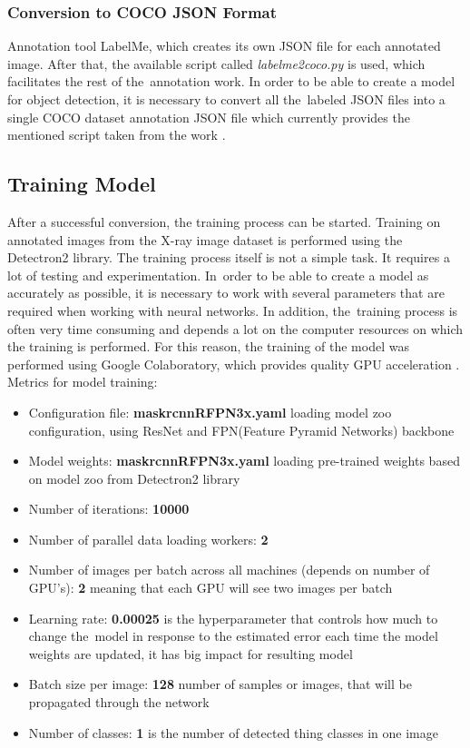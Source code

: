 \subsubsection*{Conversion to COCO JSON Format}
Annotation tool LabelMe, which creates its own JSON file for each annotated image. After that, the available script called \textit{labelme2coco.py} is used, which facilitates the rest of the~annotation work. In order to be able to create a model for object detection, it is necessary to convert all the~labeled JSON files into a single COCO dataset annotation JSON file which currently provides the mentioned script taken from the work \cite{JSONtoCOCO}.

\subsection{Training Model}
\label{training-model}
After a successful conversion, the training process can be started. Training on annotated images from the X-ray image dataset is performed using the Detectron2 library. The training process itself is not a simple task. It requires a lot of testing and experimentation. In~order to be able to create a model as accurately as possible, it is necessary to work with several parameters that are required when working with neural networks. In addition, the~training process is often very time consuming and depends a lot on the computer resources on which the training is performed. For this reason, the training of the model was performed using Google Colaboratory, which provides quality GPU acceleration \cite{google-colab}. Metrics for model training:
\begin{itemize}
  \item Configuration file: \textbf{mask\textunderscore rcnn\textunderscore R\textunderscore FPN\textunderscore 3x.yaml} loading model zoo configuration, using  ResNet and FPN(Feature Pyramid Networks) backbone
  \item Model weights: \textbf{mask\textunderscore rcnn\textunderscore R\textunderscore FPN\textunderscore 3x.yaml} loading pre-trained weights based on model zoo from Detectron2 library
  \item Number of iterations: \textbf{10000}
  \item Number of parallel data loading workers: \textbf{2}
  \item Number of images per batch across all machines (depends on number of GPU's): \textbf{2} meaning that each GPU will see two images per batch
  \item Learning rate: \textbf{0.00025} is the hyperparameter that controls how much to change the~model in response to the estimated error each time the model weights are updated, it has big impact for resulting model
  \item Batch size per image: \textbf{128} number of samples or images, that will be propagated through the network
  \item Number of classes: \textbf{1} is the number of detected thing classes in one image
\end{itemize}

